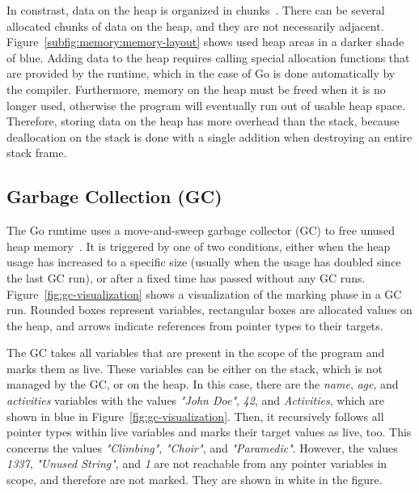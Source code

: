 In constrast, data on the heap is organized in chunks~\cite{ferres2010}.
There can be several allocated chunks of data on the heap, and they are not necessarily adjacent.
Figure~\ref{subfig:memory:memory-layout} shows used heap areas in a darker shade of blue.
Adding data to the heap requires calling special allocation functions that are provided by the runtime, which in the
case of Go is done automatically by the compiler.
Furthermore, memory on the heap must be freed when it is no longer used, otherwise the program will eventually run out
of usable heap space.
Therefore, storing data on the heap has more overhead than the stack, because deallocation on the stack is done with a
single addition when destroying an entire stack frame.



\subsection{Garbage Collection (GC)}\label{subsec:background:memory:gc}

The Go runtime uses a move-and-sweep garbage collector (\acrshort{GC}) to free unused heap memory~\cite{sibiryov2017}.
It is triggered by one of two conditions, either when the heap usage has increased to a specific size (usually when the
usage has doubled since the last \acrshort{GC} run), or after a fixed time has passed without any \acrshort{GC} runs.
Figure~\ref{fig:gc-visualization} shows a visualization of the marking phase in a \acrshort{GC} run.
Rounded boxes represent variables, rectangular boxes are allocated values on the heap, and arrows indicate references
from pointer types to their targets.



The \acrshort{GC} takes all variables that are present in the scope of the program and marks them as live.
These variables can be either on the stack, which is not managed by the \acrshort{GC}, or on the heap.
In this case, there are the \textit{name}, \textit{age}, and \textit{activities} variables with the values
\textit{"John Doe"}, \textit{42}, and \textit{Activities}, which are shown in blue in Figure~\ref{fig:gc-visualization}.
Then, it recursively follows all pointer types within live variables and marks their target values as live, too.
This concerns the values \textit{"Climbing"}, \textit{"Choir"}, and \textit{"Paramedic"}.
However, the values \textit{1337}, \textit{"Unused String"}, and \textit{1} are not reachable from any pointer variables
in scope, and therefore are not marked.
They are shown in white in the figure.

